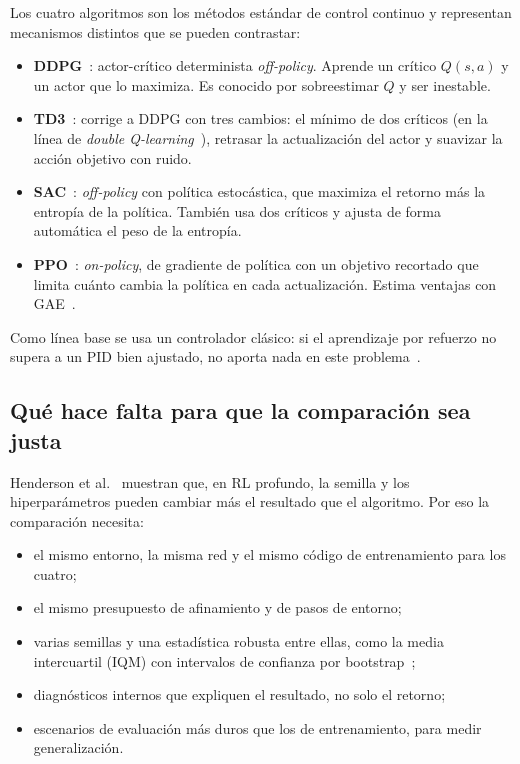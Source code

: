 \documentclass[11pt,a4paper]{article}
\begin{document}
Los cuatro algoritmos son los métodos estándar de control continuo y representan mecanismos distintos que se pueden contrastar:
\begin{itemize}
  \item \textbf{DDPG}~\cite{lillicrap2016}: actor-crítico determinista \emph{off-policy}. Aprende un crítico $Q(s,a)$ y un actor que lo maximiza. Es conocido por sobreestimar $Q$ y ser inestable.
  \item \textbf{TD3}~\cite{fujimoto2018}: corrige a DDPG con tres cambios: el mínimo de dos críticos (en la línea de \emph{double Q-learning}~\cite{vanhasselt2010}), retrasar la actualización del actor y suavizar la acción objetivo con ruido.
  \item \textbf{SAC}~\cite{haarnoja2018,haarnoja2018apps}: \emph{off-policy} con política estocástica, que maximiza el retorno más la entropía de la política. También usa dos críticos y ajusta de forma automática el peso de la entropía.
  \item \textbf{PPO}~\cite{schulman2017}: \emph{on-policy}, de gradiente de política con un objetivo recortado que limita cuánto cambia la política en cada actualización. Estima ventajas con GAE~\cite{schulman2016}.
\end{itemize}
Como línea base se usa un controlador clásico: si el aprendizaje por refuerzo no supera a un PID bien ajustado, no aporta nada en este problema~\cite{astrom2008}.

\subsection{Qué hace falta para que la comparación sea justa}

Henderson et al.~\cite{henderson2018} muestran que, en RL profundo, la semilla y los hiperparámetros pueden cambiar más el resultado que el algoritmo. Por eso la comparación necesita:
\begin{itemize}
  \item el mismo entorno, la misma red y el mismo código de entrenamiento para los cuatro;
  \item el mismo presupuesto de afinamiento y de pasos de entorno;
  \item varias semillas y una estadística robusta entre ellas, como la media intercuartil (IQM) con intervalos de confianza por bootstrap~\cite{agarwal2021};
  \item diagnósticos internos que expliquen el resultado, no solo el retorno;
  \item escenarios de evaluación más duros que los de entrenamiento, para medir generalización.
\end{itemize}
\end{document}
